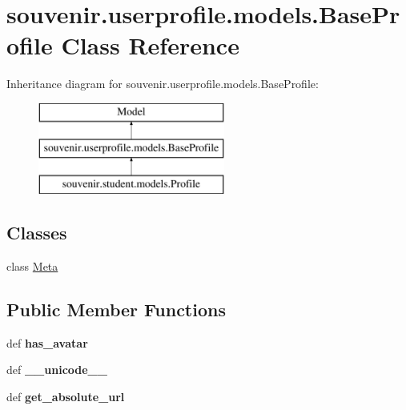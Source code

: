 \hypertarget{classsouvenir_1_1userprofile_1_1models_1_1BaseProfile}{\section{souvenir.\-userprofile.\-models.\-Base\-Profile Class Reference}
\label{classsouvenir_1_1userprofile_1_1models_1_1BaseProfile}
}
Inheritance diagram for souvenir.\-userprofile.\-models.\-Base\-Profile\-:\begin{figure}[H]
\begin{center}
\leavevmode
\includegraphics[height=3.000000cm]{classsouvenir_1_1userprofile_1_1models_1_1BaseProfile}
\end{center}
\end{figure}
\subsection*{Classes}
\begin{DoxyCompactItemize}
\item 
class \hyperlink{classsouvenir_1_1userprofile_1_1models_1_1BaseProfile_1_1Meta}{Meta}
\end{DoxyCompactItemize}
\subsection*{Public Member Functions}
\begin{DoxyCompactItemize}
\item 
\hypertarget{classsouvenir_1_1userprofile_1_1models_1_1BaseProfile_a251556df3ef81771e5749bcef771734e}{def {\bfseries has\-\_\-avatar}}\label{classsouvenir_1_1userprofile_1_1models_1_1BaseProfile_a251556df3ef81771e5749bcef771734e}

\item 
\hypertarget{classsouvenir_1_1userprofile_1_1models_1_1BaseProfile_a97b471335c120b3d6e7ddd1e98cb7263}{def {\bfseries \-\_\-\-\_\-unicode\-\_\-\-\_\-}}\label{classsouvenir_1_1userprofile_1_1models_1_1BaseProfile_a97b471335c120b3d6e7ddd1e98cb7263}

\item 
\hypertarget{classsouvenir_1_1userprofile_1_1models_1_1BaseProfile_a61a6d7b37a87032428f90ee36316db31}{def {\bfseries get\-\_\-absolute\-\_\-url}}\label{classsouvenir_1_1userprofile_1_1models_1_1BaseProfile_a61a6d7b37a87032428f90ee36316db31}

\end{DoxyCompactItemize}
